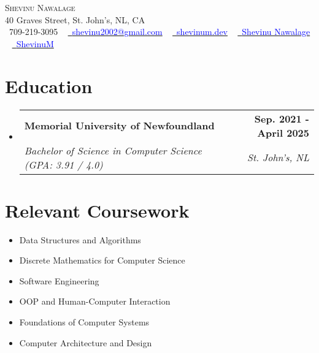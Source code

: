 \documentclass[letterpaper,11pt]{article}
\makeatletter
\newcommand{\resumeSubheading}[4]{
  \vspace{-2pt}\item
    \begin{tabular*}{1.0\textwidth}[t]{l@{\extracolsep{\fill}}r}
      \textbf{#1} & \textbf{\small #2} \\
      \textit{\small#3} & \textit{\small #4} \\
    \end{tabular*}\vspace{-7pt}
}
\newcommand{\resumeSubHeadingListStart}{\begin{itemize}[leftmargin=0.0in, label={}]}
\newcommand{\resumeSubHeadingListEnd}{\end{itemize}}
\makeatother
\begin{document}

\begin{center}
    {\Huge \scshape Shevinu Nawalage} \\ \vspace{5pt}
    40 Graves Street, St. John's, NL, CA \\ \vspace{3pt}
    \small \raisebox{-0.1\height}\faPhone\ 709-219-3095 ~ \href{mailto:shevinu2002@gmail.com}{\raisebox{-0.2\height}\faEnvelope\  {\textcolor{blue}{shevinu2002@gmail.com}}} ~ 
    \href{http://shevinum.dev}{\raisebox{-0.2\height}\faGlobe\ {\textcolor{blue}{shevinum.dev}}}  ~
    \href{https://www.linkedin.com/in/shevinu-nawalage-a109371bb/}{\raisebox{-0.2\height}\faLinkedin\ {\textcolor{blue}{Shevinu Nawalage}}}  ~
    \href{https://github.com/ShevinuM}{\raisebox{-0.2\height}\faGithub\ {\textcolor{blue}{ShevinuM}}}
    \vspace{-2pt}
\end{center}


\section{Education}
  \resumeSubHeadingListStart
    \resumeSubheading
      {Memorial University of Newfoundland}{Sep. 2021 - April 2025}
      {Bachelor of Science in Computer Science (GPA: 3.91 / 4.0)}{St. John's, NL}
  \resumeSubHeadingListEnd
  
\section{Relevant Coursework}
        \begin{multicols}{1}
            \begin{itemize}[itemsep=-5pt, parsep=3pt]
                \item\small Data Structures and Algorithms
                \item Discrete Mathematics for Computer Science
                \item Software Engineering 
                \item OOP and Human-Computer Interaction
                \item Foundations of Computer Systems
                \item Computer Architecture and Design
            \end{itemize}
        \end{multicols}
        \vspace*{2.0\multicolsep}
\end{document}
